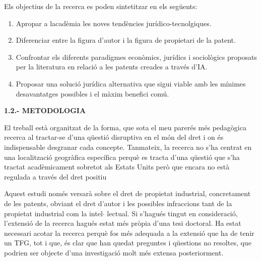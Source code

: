 \documentclass[12pt]{article}
\renewcommand{\_}{\kern-1.5pt\textunderscore\kern-1.5pt}
\begin{document}
\begin{itemize}
\vspace{\baselineskip}
\begin{justify}
Els objectius de la recerca es poden sintetitzar en els següents:
\end{justify}\par


\vspace{\baselineskip}
\begin{enumerate}
	\item Apropar a lacadèmia les noves tendències jurídico-tecnolgiques.\par

	\item Diferenciar entre la figura d’autor i la figura de propietari de la patent.\par

	\item Confrontar els diferents paradigmes econòmics, jurídics i sociològics  proposats per la literatura en relació a les patents creades a través d’IA.\par

	\item Proposar una solució jurídica alternativa que sigui viable amb les mínimes desavantatges possibles i el màxim benefici comú.
\end{enumerate}\par


\vspace{\baselineskip}
\textbf{1.2.- METODOLOGIA}\par


\vspace{\baselineskip}
\begin{justify}
El treball està organitzat de la forma, que sota el meu parerés més pedagògica  recerca al tractar-se d’una qüestió disruptiva en el món del dret i on és indispensable desgranar cada concepte. Tanmateix, la recerca no s’ha centrat en una localització geogràfica específica perquè es tracta d’una qüestió que s’ha tractat acadèmicament sobretot als Estats Units però que encara no està regulada a través del dret positiu 
\end{justify}\par


\vspace{\baselineskip}
\begin{justify}
Aquest estudi només versarà sobre el dret de propietat industrial, concretament de les patents, obviant el dret d’autor i les possibles infraccions tant de la propietat industrial com la intel$ \cdot $ lectual. Si s’hagués tingut en consideració, l’extensió de la recerca hagués estat més pròpia d’una tesi doctoral. Ha estat necessari acotar la recerca perquè fos més adequada a la extensió que ha de tenir un TFG, tot i que, és clar que han quedat preguntes i qüestions no resoltes, que podrien ser objecte d’una investigació molt més extensa posteriorment.
\end{justify}\par



\end{itemize}
\end{document}
